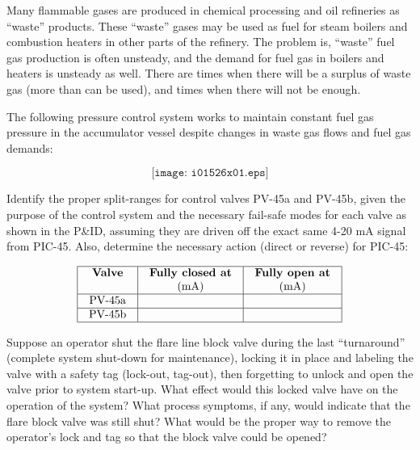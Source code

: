 

Many flammable gases are produced in chemical processing and oil refineries as ``waste'' products.  These ``waste'' gases may be used as fuel for steam boilers and combustion heaters in other parts of the refinery.  The problem is, ``waste'' fuel gas production is often unsteady, and the demand for fuel gas in boilers and heaters is unsteady as well.  There are times when there will be a surplus of waste gas (more than can be used), and times when there will not be enough.

The following pressure control system works to maintain constant fuel gas pressure in the accumulator vessel despite changes in waste gas flows and fuel gas demands:

$$\texttt{[image: i01526x01.eps]}$$

Identify the proper split-ranges for control valves PV-45a and PV-45b, given the purpose of the control system and the necessary fail-safe modes for each valve as shown in the P\&ID, assuming they are driven off the exact same 4-20 mA signal from PIC-45.  Also, determine the necessary action (direct or reverse) for PIC-45:


$$\vbox{\offinterlineskip
\halign{\strut
\vrule \quad\hfil # \ \hfil & 
\vrule \quad\hfil # \ \hfil & 
\vrule \quad\hfil # \ \hfil \vrule \cr
\noalign{\hrule}
%
{\bf Valve} & {\bf Fully closed at} & {\bf Fully open at} \cr
 & (mA) & (mA) \cr
%
\noalign{\hrule}
%
PV-45a &  &  \cr
%
\noalign{\hrule}
%
PV-45b &  &  \cr
%
\noalign{\hrule}
} %
}$$ %

Suppose an operator shut the flare line block valve during the last ``turnaround'' (complete system shut-down for maintenance), locking it in place and labeling the valve with a safety tag (lock-out, tag-out), then forgetting to unlock and open the valve prior to system start-up.  What effect would this locked valve have on the operation of the system?  What process symptoms, if any, would indicate that the flare block valve was still shut?  What would be the proper way to remove the operator's lock and tag so that the block valve could be opened?

